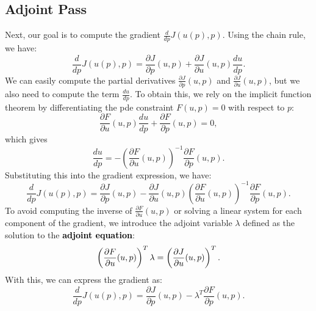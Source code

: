 \subsection{Adjoint Pass}
Next, our goal is to compute the gradient $\frac{d}{dp}J(u(p),p)$. Using the chain rule, we have:
\begin{equation}
    \frac{d}{dp}J(u(p),p) = \frac{\partial J}{\partial p}(u,p) + \frac{\partial J}{\partial u}(u,p) \frac{du}{dp}.
\end{equation}
We can easily compute the partial derivatives $\frac{\partial J}{\partial p}(u,p)$ and $\frac{\partial J}{\partial u}(u,p)$, but we also need to compute the term $\frac{du}{dp}$. To obtain this, we rely on the implicit function theorem by differentiating the pde constraint $F(u,p) = 0$ with respect to $p$:
\begin{equation}
    \frac{\partial F}{\partial u}(u,p) \frac{du}{dp} + \frac{\partial F}{\partial p}(u,p) = 0,          
\end{equation}
which gives
\begin{equation}
    \frac{du}{dp} = - \left(\frac{\partial F}{\partial u}(u,p)\right)^{-1} \frac{\partial F}{\partial p}(u,p).
\end{equation}
Substituting this into the gradient expression, we have:
\begin{equation}    
    \frac{d}{dp}J(u(p),p) = \frac{\partial J}{\partial p}(u,p) - \frac{\partial J}{\partial u}(u,p) \left(\frac{\partial F}{\partial u}(u,p)\right)^{-1} \frac{\partial F}{\partial p}(u,p).
\end{equation}
To avoid computing the inverse of $\frac{\partial F}{\partial u}(u,p)$ or solving a linear system for each component of the gradient, we introduce the adjoint variable $\lambda$ defined as the solution to the \textcolor{black}{\textbf{adjoint equation}}:
\begin{equation}
    \color{black}{\left(\frac{\partial F}{\partial u}(u,p)\right)^T \lambda =  \left(\frac{\partial J}{\partial u}(u,p)\right)^T.}
\end{equation}
With this, we can express the gradient as:
\begin{equation}
    \frac{d}{dp}J(u(p),p) = \frac{\partial J}{\partial p}(u,p) - \lambda^T \frac{\partial F}{\partial p}(u,p).
\end{equation}

